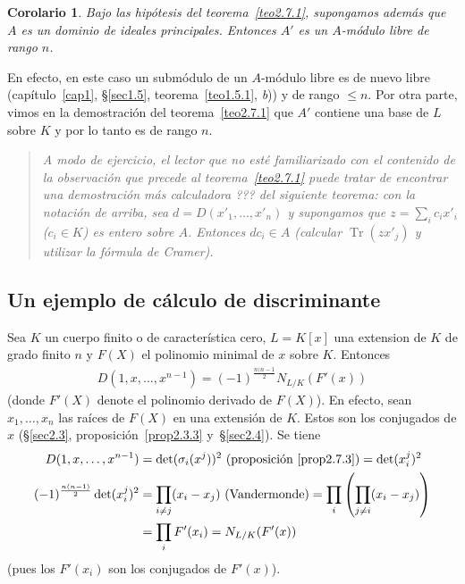 \documentclass[bibtotoc,leqno,spanish]{amsbook}
\DeclareMathOperator{\Tr}{Tr}
\numberwithin{equation}{section}
\newenvironment{comm}%
	{\begin{quotation}\itshape\Small}
	{\end{quotation}}
\theoremstyle{note}
\theoremstyle{note}
\newtheorem*{corollary*}{Corolario}
\theoremstyle{rem}
\numberwithin{theorem}{section}
\numberwithin{proposition}{section}
\numberwithin{definition}{section}
\numberwithin{lemma}{section}
\numberwithin{corollary}{section}
\numberwithin{example}{section}
\numberwithin{footnote}{section}%
\begin{document}
\begin{corollary*}
Bajo las hip\'otesis del teorema~\ref{teo2.7.1}, supongamos adem\'as que $A$ es un dominio de ideales principales. Entonces
$A'$ es un $A$-m\'odulo libre de rango $n$.
\end{corollary*}

En efecto, en este caso un subm\'odulo de un $A$-m\'odulo libre es de nuevo libre
(cap\'itulo~\ref{cap1}, \S\ref{sec1.5}, teorema~\ref{teo1.5.1}, {\itshape b}))
y de rango $\leq n$. Por otra parte, vimos en la demostraci\'on del teorema~\ref{teo2.7.1} que $A'$ contiene una base de $L$ sobre
$K$ y por lo tanto es de rango $n$.

\begin{comm}
A modo de ejercicio, el lector que no est\'e familiarizado con el contenido de la observaci\'on que
precede al teorema~\ref{teo2.7.1} puede tratar de encontrar una demostraci\'on m\'as calculadora ??? del siguiente teorema:
con la notaci\'on de arriba, sea $d = D(x'_{1},\dots,x'_{n})$ y supongamos que $z = \sum_{i}c_{i}x'_{i}$
($c_{i}\in K$) es entero sobre $A$. Entonces $dc_{i}\in A$ (calcular $\Tr(zx'_{j})$ y utilizar la f\'ormula de
Cramer).
\end{comm}

\subsection*{Un ejemplo de c\'alculo de discriminante}

Sea $K$ un cuerpo finito o de caracter\'istica cero, $L = K[x]$ una extension de $K$ de grado finito $n$ y
$F(X)$ el polinomio minimal de $x$ sobre $K$. Entonces
\begin{gather}\label{eq2.7.6}
D(1,x,\dots,x^{n-1})=(-1)^{\frac{n(n-1}{2}}N_{L/K}(F'(x))
\end{gather}
(donde $F'(X)$ denote el polinomio derivado de $F(X)$). En efecto, sean $x_{1},\dots,x_{n}$ las ra\'ices de
$F(X)$ en una extensi\'on de $K$. Estos son los conjugados de $x$
(\S\ref{sec2.3}, proposici\'on~\ref{prop2.3.3} y~\S\ref{sec2.4}). Se tiene
\begin{align*}
D(1,x,\dots,x^{n-1}) &= \det(\sigma_{i}(x^{j}))^{2}\text{ (proposici\'on~\ref{prop2.7.3})} = \det(x_{i}^{j})^{2}\\
(-1)^{\frac{n(n-1)}{2}}\det(x_{i}^{j})^{2} &= \prod_{i\neq j}(x_{i}-x_{j})\text{ (Vandermonde)} =
\prod_{i}\left(\prod_{j\neq i}(x_{i}-x_{j})\right)\\
&=\prod_{i}F'(x_{i}) = N_{L/K}(F'(x))
\end{align*}
(pues los $F'(x_{i})$ son los conjugados de $F'(x)$).
\end{document}
